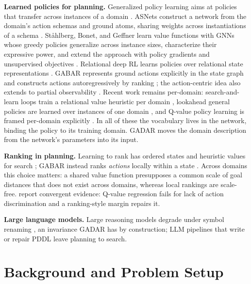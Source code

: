 \documentclass[letterpaper]{article} %
\newcommand{\gadar}{GADAR}                    %
\begin{document}
\textbf{Learned policies for planning.} Generalized policy learning aims at
policies that transfer across instances of a domain \citep{approx_Policy_iter,
relational_rl}. ASNets construct a network from the domain's action schemas
and ground atoms, sharing weights across instantiations of a schema
\citep{toyer2020asnets}. St{\aa}hlberg, Bonet, and Geffner learn value
functions with GNNs whose greedy policies generalize across instance sizes,
characterize their expressive power, and extend the approach with policy
gradients and unsupervised objectives \citep{expressive_v1, unsupervised_gnn,
policy_gradients, policy_beyond_c2}. Relational deep RL learns policies over
relational state representations \citep{relational_drl, sr_drl,
relational_mdp_learning, rddl_gnn, generalized_planning_deep_rl}. GABAR
represents ground actions explicitly in the state graph and constructs
actions autoregressively by ranking \citep{gabar}; the action-centric idea
also extends to partial observability \citep{gammazero, hoo_pomdp}. Recent
work remains per-domain: search-and-learn loops train a relational value
heuristic per domain \citep{learning_to_search_2026}, lookahead general
policies are learned over instances of one domain
\citep{lookahead_policies_2026}, and Q-value policy learning is framed
per-domain explicitly \citep{mueller_qvalues}. In all of these the
vocabulary lives in the network, binding the policy to its training domain.
\gadar{} moves the domain description from the network's parameters into
its input.

\textbf{Ranking in planning.} Learning to rank has ordered states and
heuristic values for search \citep{ranking_old_2009, ranking_og,
chrestien_optimize, gbfs_v2}; GABAR instead ranks \emph{actions} locally
within a state \citep{gabar}. Across domains this choice matters: a shared
value function presupposes a common scale of goal distances that does not
exist across domains, whereas local rankings are scale-free.
\citet{mueller_qvalues} report convergent evidence: Q-value regression
fails for lack of action discrimination and a ranking-style margin repairs
it.

\textbf{Large language models.} Large reasoning models degrade under symbol
renaming \citep{llm_baseline}, an invariance \gadar{} has by construction;
LLM pipelines that write or repair PDDL \citep{halo_orchestrator} leave
planning to search.

\section{Background and Problem Setup}
\end{document}

